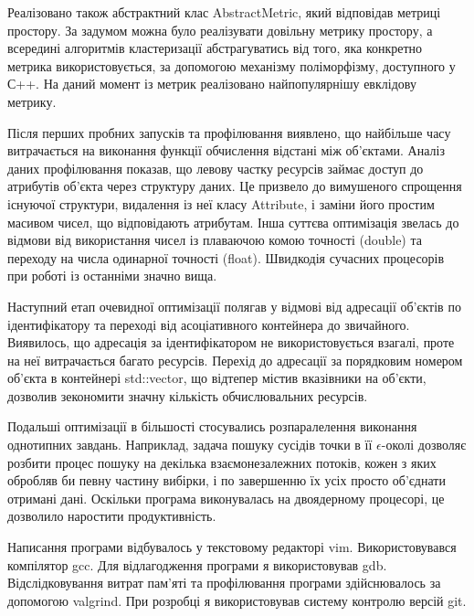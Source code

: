         Реалізовано також абстрактний клас AbstractMetric, який відповідав метриці простору. За задумом можна було реалізувати довільну метрику простору, а всередині алгоритмів кластеризації абстрагуватись від того, яка конкретно метрика використовується, за допомогою механізму поліморфізму, доступного у С++. На даний момент із метрик реалізовано найпопулярнішу евклідову метрику.
        
        Після перших пробних запусків та профілювання виявлено, що найбільше часу витрачається на виконання функції обчислення відстані між об'єктами. Аналіз даних профілювання показав, що левову частку ресурсів займає доступ до атрибутів об'єкта через структуру даних. Це призвело до вимушеного спрощення існуючої структури, видалення із неї класу Attribute, і заміни його простим масивом чисел, що відповідають атрибутам. Інша суттєва оптимізація звелась до відмови від використання чисел із плаваючою комою точності (double) та переходу на числа одинарної точності (float). Швидкодія сучасних процесорів при роботі із останніми значно вища.
        
        Наступний етап очевидної оптимізації полягав у відмові від адресації об'єктів по ідентифікатору та переході від асоціативного контейнера до звичайного. Виявилось, що адресація за ідентифікатором не використовується взагалі, проте на неї витрачається багато ресурсів. Перехід до адресації за порядковим номером об'єкта в контейнері std::vector, що відтепер містив вказівники на об'єкти, дозволив зекономити значну кількість обчислювальних ресурсів.
        
        Подальші оптимізації в більшості стосувались розпаралелення виконання однотипних завдань. Наприклад, задача пошуку сусідів точки в її $\epsilon$-околі дозволяє розбити процес пошуку на декілька взаємонезалежних потоків, кожен з яких обробляв би певну частину вибірки, і по завершенню їх усіх просто об'єднати отримані дані. Оскільки програма виконувалась на двоядерному процесорі, це дозволило наростити продуктивність.
        
        Написання програми відбувалось у текстовому редакторі vim. Використовувався компілятор gcc. Для відлагодження програми я використовував gdb. Відслідковування витрат пам'яті та профілювання програми здійснювалось за допомогою valgrind. При розробці я використовував систему контролю версій git.
